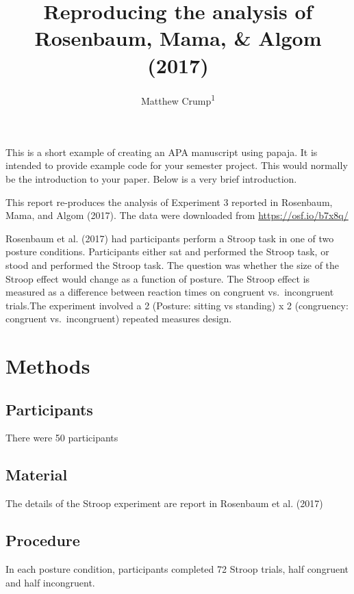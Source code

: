 \documentclass[
  english,
  man]{apa6}
\title{Reproducing the analysis of Rosenbaum, Mama, \& Algom (2017)}
\author{Matthew Crump\textsuperscript{1}}
\date{}
\affiliation{\vspace{0.5cm}\textsuperscript{1} Brooklyn College of the City University of New York}
\begin{document}
\maketitle

This is a short example of creating an APA manuscript using papaja. It is intended to provide example code for your semester project. This would normally be the introduction to your paper. Below is a very brief introduction.

This report re-produces the analysis of Experiment 3 reported in Rosenbaum, Mama, and Algom (2017). The data were downloaded from \url{https://osf.io/b7x8q/}

Rosenbaum et al. (2017) had participants perform a Stroop task in one of two posture conditions. Participants either sat and performed the Stroop task, or stood and performed the Stroop task. The question was whether the size of the Stroop effect would change as a function of posture. The Stroop effect is measured as a difference between reaction times on congruent vs.~incongruent trials.The experiment involved a 2 (Posture: sitting vs standing) x 2 (congruency: congruent vs.~incongruent) repeated measures design.

\hypertarget{methods}{%
\section{Methods}\label{methods}}

\hypertarget{participants}{%
\subsection{Participants}\label{participants}}

There were 50 participants

\hypertarget{material}{%
\subsection{Material}\label{material}}

The details of the Stroop experiment are report in Rosenbaum et al. (2017)

\hypertarget{procedure}{%
\subsection{Procedure}\label{procedure}}

In each posture condition, participants completed 72 Stroop trials, half congruent and half incongruent.
\end{document}
